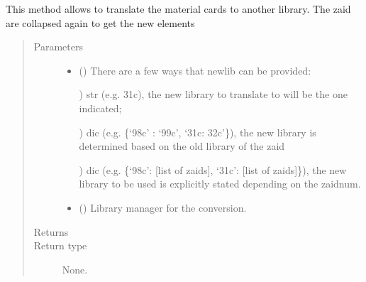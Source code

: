 \documentclass[letterpaper,10pt,english]{sphinxmanual}
\begin{document}
\begin{fulllineitems}
\begin{fulllineitems}
\label{\detokenize{api/inputgeneration:matreader.MatCardsList.translate}}
\sphinxAtStartPar
This method allows to translate the material cards to another library.
The zaid are collapsed again to get the new elements
\begin{quote}\begin{description}
\item[{Parameters}] \leavevmode\begin{itemize}
\item {} 
\sphinxAtStartPar
{} () \textendash{} 
\sphinxAtStartPar
There are a few ways that newlib can be provided:

) str (e.g. 31c), the new library to translate to will be the
one indicated;

) dic (e.g. \{‘98c’ : ‘99c’, ‘31c: 32c’\}), the new library is
determined based on the old library of the zaid

) dic (e.g. \{‘98c’: {[}list of zaids{]}, ‘31c’: {[}list of zaids{]}\}),
the new library to be used is explicitly stated depending
on the zaidnum.


\item {} 
\sphinxAtStartPar
{} ({\hyperref[\detokenize{api/initobjects:libmanager.LibManager}]{}}) \textendash{} Library manager for the conversion.

\end{itemize}

\item[{Returns}] \leavevmode
\sphinxAtStartPar


\item[{Return type}] \leavevmode
\sphinxAtStartPar
None.

\end{description}\end{quote}

\end{fulllineitems}



\end{fulllineitems}
\end{document}

